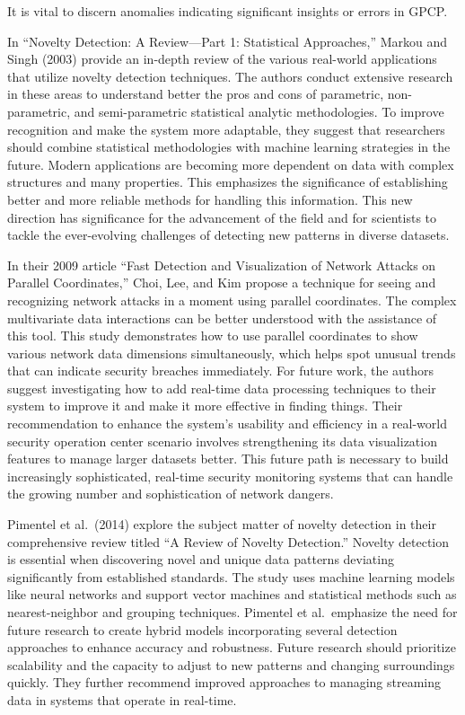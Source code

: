 \documentclass[print]{nuthesis}
\begin{document}
It is vital to discern anomalies indicating significant insights or errors in GPCP.

In ``Novelty Detection: A Review---Part 1: Statistical Approaches,'' Markou and Singh (2003) provide an in-depth review of the various real-world applications that utilize novelty detection techniques.
The authors conduct extensive research in these areas to understand better the pros and cons of parametric, non-parametric, and semi-parametric statistical analytic methodologies.
To improve recognition and make the system more adaptable, they suggest that researchers should combine statistical methodologies with machine learning strategies in the future.
Modern applications are becoming more dependent on data with complex structures and many properties.
This emphasizes the significance of establishing better and more reliable methods for handling this information.
This new direction has significance for the advancement of the field and for scientists to tackle the ever-evolving challenges of detecting new patterns in diverse datasets.

In their 2009 article ``Fast Detection and Visualization of Network Attacks on Parallel Coordinates,'' Choi, Lee, and Kim propose a technique for seeing and recognizing network attacks in a moment using parallel coordinates.
The complex multivariate data interactions can be better understood with the assistance of this tool.
This study demonstrates how to use parallel coordinates to show various network data dimensions simultaneously, which helps spot unusual trends that can indicate security breaches immediately.
For future work, the authors suggest investigating how to add real-time data processing techniques to their system to improve it and make it more effective in finding things.
Their recommendation to enhance the system's usability and efficiency in a real-world security operation center scenario involves strengthening its data visualization features to manage larger datasets better.
This future path is necessary to build increasingly sophisticated, real-time security monitoring systems that can handle the growing number and sophistication of network dangers.

Pimentel et al.~(2014) explore the subject matter of novelty detection in their comprehensive review titled ``A Review of Novelty Detection.''
Novelty detection is essential when discovering novel and unique data patterns deviating significantly from established standards.
The study uses machine learning models like neural networks and support vector machines and statistical methods such as nearest-neighbor and grouping techniques.
Pimentel et al.~emphasize the need for future research to create hybrid models incorporating several detection approaches to enhance accuracy and robustness.
Future research should prioritize scalability and the capacity to adjust to new patterns and changing surroundings quickly.
They further recommend improved approaches to managing streaming data in systems that operate in real-time.
\end{document}
